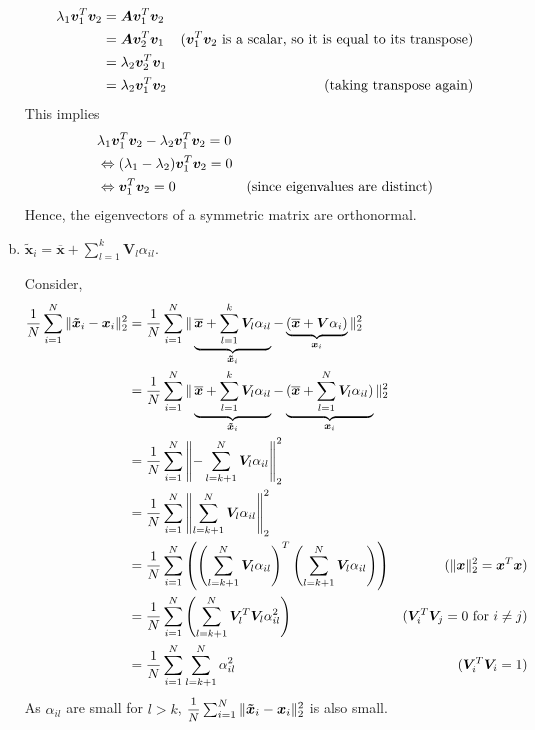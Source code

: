 \documentclass[a4paper]{article}
\begin{document}
\begin{enumerate}[(a)]
\begin{equation}
\begin{aligned}
		\lambda_1 \bm{v}_1^T \bm{v}_2
		&= \bm{A} \bm{v}_1^T \bm{v}_2\\
		&= \bm{A} \bm{v}_2^T \bm{v}_1 & \hfill{(\text{$\bm{v}_1^T \bm{v}_2$ is a scalar, so it is equal to its transpose})}\\
		&= \lambda_2 \bm{v}_2^T \bm{v}_1\\
		&= \lambda_2 \bm{v}_1^T \bm{v}_2 & \hfill{(\text{taking transpose again})}\\
	\end{aligned}
\end{equation}
This implies
\begin{equation}
	\begin{aligned}
		&\lambda_1 \bm{v}_1^T \bm{v}_2 - \lambda_2 \bm{v}_1^T \bm{v}_2 = 0\\
		&\Leftrightarrow(\lambda_1 - \lambda_2) \bm{v}_1^T \bm{v}_2 = 0\\
		&\Leftrightarrow\bm{v}_1^T \bm{v}_2 = 0 & \hfill{(\text{since eigenvalues are distinct})}
	\end{aligned}
\end{equation}
Hence, the eigenvectors of a symmetric matrix are orthonormal.
\item $\bm{\tilde{x}}_i=\bm{\overline{x}}+\sum_{l=1}^{k}\bm{V}_l\alpha_{il}$.

Consider, 
\begin{equation}
	\begin{aligned}
		\frac{1}{N}\sum_{i=1}^{N}\|\bm{\tilde{x}}_i-\bm{x}_i\|_2^2
		&= \frac{1}{N}\sum_{i=1}^{N}\|\underbrace{\bm{\overline{x}}+\sum_{l=1}^{k}\bm{V}_l\alpha_{il}}_{\bm{\tilde{x}}_i}-\underbrace{(\bm{\overline{x}}+\bm{V}\alpha_i)}_{\bm{x}_i}\|_2^2\\
		&= \frac{1}{N}\sum_{i=1}^{N}\|\underbrace{\bm{\overline{x}}+\sum_{l=1}^{k}\bm{V}_l\alpha_{il}}_{\bm{\tilde{x}}_i}-\underbrace{(\bm{\overline{x}}+\sum_{l=1}^{N}\bm{V}_l\alpha_{il})}_{\bm{x}_i}\|_2^2\\
		&= \frac{1}{N}\sum_{i=1}^{N}\left\|{-\sum_{l=k+1}^{N}\bm{V}_l\alpha_{il}}\right\|_2^2\\
		&= \frac{1}{N}\sum_{i=1}^{N}\left\|{\sum_{l=k+1}^{N}\bm{V}_l\alpha_{il}}\right\|_2^2\\
		&= \frac{1}{N}\sum_{i=1}^{N}\left(\left({\sum_{l=k+1}^{N}\bm{V}_l\alpha_{il}}\right)^T\left({\sum_{l=k+1}^{N}\bm{V}_l\alpha_{il}}\right)\right) & \hfill{(\|\bm{x}\|_2^2=\bm{x}^T\bm{x})}\\
		&= \frac{1}{N}\sum_{i=1}^{N}\left({\sum_{l=k+1}^{N}\bm{V}_l^T\bm{V}_l\alpha_{il}^2}\right) & \hfill{(\bm{V}_i^T\bm{V}_j = 0 \text{ for } i\neq j)}\\
		&= \frac{1}{N}\sum_{i=1}^{N}{\sum_{l=k+1}^{N}\alpha_{il}^2} & \hfill{(\bm{V}_i^T\bm{V}_i = 1)}\\
	\end{aligned}
\end{equation}
As $\alpha_{il}$ are small for $l>k$, $\mfrac{1}{N}\sum_{i=1}^{N}\|\bm{\tilde{x}}_i-\bm{x}_i\|_2^2$ is also small.


\end{enumerate}
\end{document}
